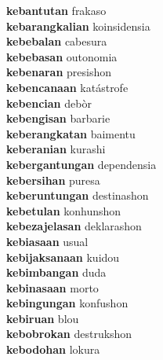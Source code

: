 \textbf{kebantutan } frakaso \\
\textbf{kebarangkalian } koinsidensia \\
\textbf{kebebalan } cabesura \\
\textbf{kebebasan } outonomia \\
\textbf{kebenaran } presishon \\
\textbf{kebencanaan } katástrofe \\
\textbf{kebencian } debòr \\
\textbf{kebengisan } barbarie \\
\textbf{keberangkatan } baimentu \\
\textbf{keberanian } kurashi \\
\textbf{kebergantungan } dependensia \\
\textbf{kebersihan } puresa \\
\textbf{keberuntungan } destinashon \\
\textbf{kebetulan } konhunshon \\
\textbf{kebezajelasan } deklarashon \\
\textbf{kebiasaan } usual \\
\textbf{kebijaksanaan } kuidou \\
\textbf{kebimbangan } duda \\
\textbf{kebinasaan } morto \\
\textbf{kebingungan } konfushon \\
\textbf{kebiruan } blou \\
\textbf{kebobrokan } destrukshon \\
\textbf{kebodohan } lokura \\
